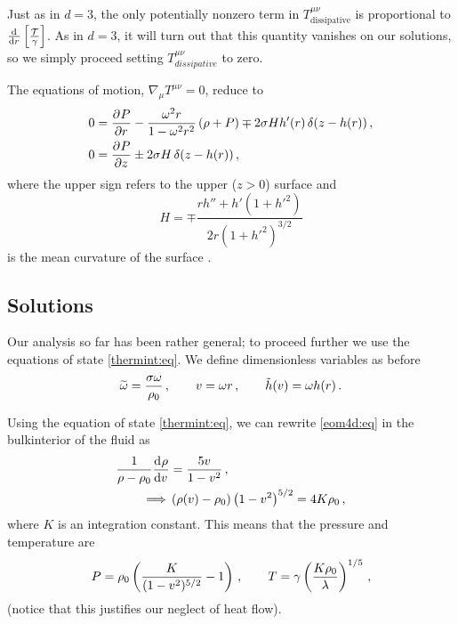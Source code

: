 Just as in $d=3$, the only potentially nonzero term in
$T_\mathrm{dissipative}^{\mu \nu}$ is proportional to
$\diff{}{r}\brk{\frac{\tloc}{\gamma}}$. As in $d=3$, it will turn
out that this quantity vanishes on our solutions, so we simply
proceed setting $T^{\mu \nu}_{dissipative}$ to zero.


The equations of motion, $\nabla_\mu T^{\mu\nu}=0$, reduce to
%
\begin{equation}\label{eom4d:eq}
 \begin{split}
   0 &= \pdiff{P}{r} -\frac{\omega^2r}{1-\omega^2r^2}\,(\rho+P)
              \mp 2\sigma H h'(r)\, \delta(z-h(r))\,,\\
   0 &= \pdiff{P}{z} \pm 2\sigma H\, \delta(z-h(r))\,,
 \end{split}
\end{equation}
%
where the upper sign refers to the upper ($z>0$) surface and
%
\begin{equation}\label{meancurv:eq}
  H = \mp\frac{rh''+ h'(1+h'^2)}{2r(1+h'^2)^{3/2}}
\end{equation}
%
is the mean curvature of the surface \cite{Weisstein-SurfRevo:99}.

\subsection{Solutions}\label{sec:sol4d}

Our analysis so far has been rather general; to proceed further we
use the equations of state \eqref{thermint:eq}. We define
dimensionless variables as before
%
\begin{equation}\label{newvars4d:eq}
    \widetilde{\omega} = \frac{\sigma\omega}{\rho_0} \,,   \qquad
    v = \omega r  \,,  \qquad
    \tilde h(v) = \omega h(r)\,.
\end{equation}

Using the equation of state \eqref{thermint:eq}, we can rewrite
\eqref{eom4d:eq} in the bulkinterior of the fluid as
%
\begin{equation}\label{eombulk4d:eq}
 \begin{split}
  \frac{1}{\rho-\rz}\diff{\rho}{v} &=
                        \frac{5v}{1-v^2}\,,\\
                        \implies&
  \prn{\rho(v)-\rz}\prn{1-v^2}^{5/2} = 4K\rz\,,
 \end{split}
\end{equation}
%
where $K$ is an integration constant. This means that the pressure
and temperature are
%
\begin{equation}\label{PT4d:eq}
    P = \rho_0 \left ( \frac{K}{(1-v^2)^{5/2}}-1 \right )\,, \qquad
    T = \gamma \left ( \frac{K\rho_0}{\lambda} \right )^{1/5}\,,
\end{equation}
%
(notice that this justifies our neglect of heat flow).

